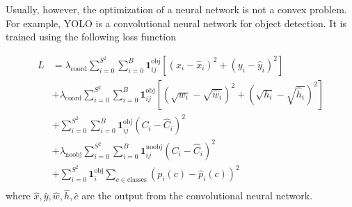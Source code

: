 Usually, however, the optimization of a neural network is not a convex problem. For example, YOLO is a convolutional neural network for object detection. It is trained using the following loss function

\begin{equation}
    \begin{split}
        L
        &= \lambda_{\text{coord}}
        \sum_{i=0}^{S^2}\sum_{i=0}^{B}\mathbf{1}_{ij}^{\text{obj}}
        \left[(x_i-\hat{x}_i)^2+(y_i-\hat{y}_i)^2\right] \\
        &+ \lambda_{\text{coord}}
        \sum_{i=0}^{S^2}\sum_{i=0}^{B}\mathbf{1}_{ij}^{\text{obj}}
        \left[(\sqrt{w_i}-\sqrt{\hat{w}_i})^2+(\sqrt{h_i}-\sqrt{\hat{h}_i})^2\right] \\
        &+ \sum_{i=0}^{S^2}\sum_{i=0}^{B}\mathbf{1}_{ij}^{\text{obj}}
        \left(C_i-\hat{C}_i\right)^2\\
        &+ \lambda_{\text{noobj}}
        \sum_{i=0}^{S^2}\sum_{i=0}^{B}\mathbf{1}_{ij}^{\text{noobj}}
        \left(C_i-\hat{C}_i\right)^2\\
        &+ \sum_{i=0}^{S^2}\mathbf{1}_{i}^{\text{obj}}\sum_{c\in \text{classes}}
        (p_i(c)-\hat{p}_i(c))^2 \\
    \end{split}
\end{equation}
%
where $\hat{x}, \hat{y}, \hat{w}, \hat{h}, \hat{c}$ are the output from the convolutional neural network.
%
